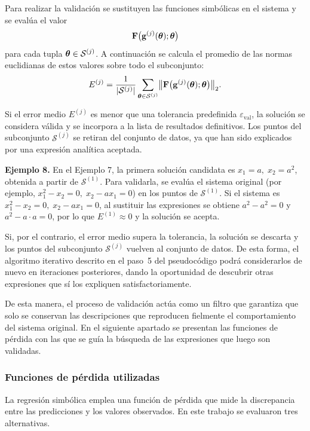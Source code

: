 \documentclass[12pt,a4paper]{article} \usepackage[utf8]{inputenc} \usepackage[spanish]{babel} \usepackage{amsmath, amssymb, amsthm} \usepackage{bm} \usepackage{float} \usepackage{longtable} \usepackage[hidelinks]{hyperref}
\begin{document}
Para realizar la validación se sustituyen las funciones simbólicas en el
sistema y se evalúa el valor
\[
\mathbf{F}\bigl( \mathbf{g}^{(j)}(\boldsymbol{\theta}); \boldsymbol{\theta} \bigr)
\]
para cada tupla \(\boldsymbol{\theta} \in \mathcal{S}^{(j)}\). A continuación se
calcula el promedio de las normas euclidianas de estos valores sobre
todo el subconjunto:
\[
E^{(j)} = \frac{1}{|\mathcal{S}^{(j)}|}
\sum_{\boldsymbol{\theta} \in \mathcal{S}^{(j)}}
\bigl\| \mathbf{F}\bigl( \mathbf{g}^{(j)}(\boldsymbol{\theta}); \boldsymbol{\theta} \bigr) \bigr\|_2.
\]

Si el error medio \(E^{(j)}\) es menor que una tolerancia predefinida
\(\varepsilon_{\text{val}}\), la solución se considera válida y se
incorpora a la lista de resultados definitivos. Los puntos del
subconjunto \(\mathcal{S}^{(j)}\) se retiran del conjunto de datos, ya
que han sido explicados por una expresión analítica aceptada.

\bigskip
\noindent\textbf{Ejemplo 8.} En el Ejemplo 7, la primera solución
candidata es \(x_1 = a,\; x_2 = a^2\), obtenida a partir de
\(\mathcal{S}^{(1)}\). Para validarla, se evalúa el sistema original
(por ejemplo, \(x_1^2 - x_2 = 0,\; x_2 - a x_1 = 0\)) en los puntos de
\(\mathcal{S}^{(1)}\). Si el sistema es
\(x_1^2 - x_2 = 0,\; x_2 - a x_1 = 0\), al sustituir las expresiones se
obtiene \(a^2 - a^2 = 0\) y \(a^2 - a \cdot a = 0\), por lo que
\(E^{(1)} \approx 0\) y la solución se acepta.

Si, por el contrario, el error medio supera la tolerancia, la solución
se descarta y los puntos del subconjunto \(\mathcal{S}^{(j)}\) vuelven
al conjunto de datos. De esta forma, el algoritmo iterativo descrito en
el paso~5 del pseudocódigo podrá considerarlos de nuevo en iteraciones
posteriores, dando la oportunidad de descubrir otras expresiones que sí
los expliquen satisfactoriamente.

De esta manera, el proceso de validación actúa como un filtro que
garantiza que solo se conservan las descripciones que reproducen
fielmente el comportamiento del sistema original. En el siguiente
apartado se presentan las funciones de pérdida con las que se guía la
búsqueda de las expresiones que luego son validadas.


\subsubsection{Funciones de pérdida utilizadas}
\label{sec:funciones_perdida}

La regresión simbólica emplea una función de pérdida que mide la
discrepancia entre las predicciones y los valores observados. En este
trabajo se evaluaron tres alternativas.
\end{document}

